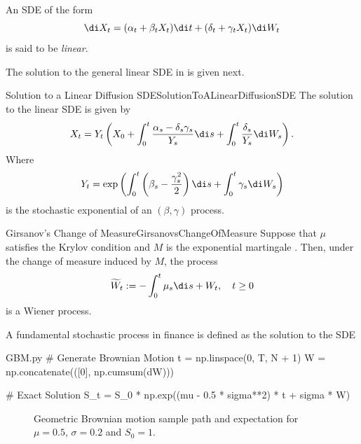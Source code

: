 An SDE of the form
\begin{equation}
	\di X_t = (\alpha_t  + \beta_t X_t) \di t + (\delta_t + \gamma_t X_t) \di W_t
	\label{eq:LinearSDE}
\end{equation}
is said to be \textit{linear}.

The solution to the general linear SDE in  is given next.

\begin{prop}{Solution to a Linear Diffusion SDE}{SolutionToALinearDiffusionSDE}
	The solution to the linear SDE  is given by
	\begin{equation}\label{eq:LinearSDESolution}
		X_t
		= Y_t \left(
		X_0
		+ \int_0^t \frac{\alpha_s - \delta_s \gamma_s}{Y_s} \di s
		+ \int_0^t \frac{\delta_s}{Y_s} \di W_s
		\right).
	\end{equation}
	Where
	\begin{equation}\label{eq:LinearSDEIntegratingFactor}
		Y_t
		= \exp \left(
		\int_0^t \left( \beta_s - \frac{\gamma_s^2}{2} \right) \di s
		+ \int_0^t \gamma_s \di W_s
		\right)
	\end{equation}
	is the stochastic exponential of an \Ito\((\beta, \gamma)\) process.
\end{prop}

\begin{thm}{Girsanov's Change of Measure}{GirsanovsChangeOfMeasure}
	Suppose that \(\mu\) satisfies the Krylov condition  and \(M\) is the exponential martingale . Then, under the change of measure  induced by \(M\), the \Ito{} process
	\begin{equation*}
		\widetilde{W}_t := -\int_0^t \mu_s \di s + W_t, \quad t \ge 0
	\end{equation*}
	is a Wiener process.
\end{thm}

A fundamental stochastic process in finance is defined as the solution to the SDE

\begin{Pcode}{GBM.py}
	# Generate Brownian Motion
	t = np.linspace(0, T, N + 1)
	W = np.concatenate(([0], np.cumsum(dW)))

	# Exact Solution
	S_t = S_0 * np.exp((mu - 0.5 * sigma**2) * t + sigma * W)
\end{Pcode}

\begin{figure}[H]
	\centering
	
	\caption{Geometric Brownian motion sample path and expectation for \(\mu=0.5\), \(\sigma=0.2\) and \(S_0=1\).}
	\label{fig:geometricBrownianMotion}
\end{figure}
